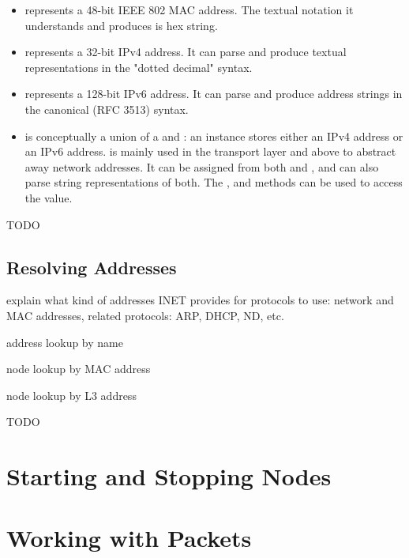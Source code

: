 \begin{itemize}
  \item {} represents a 48-bit IEEE 802 MAC address. The
    textual notation it understands and produces is hex string.

  \item {} represents a 32-bit IPv4 address. It can parse
    and produce textual representations in the "dotted decimal" syntax.

  \item {} represents a 128-bit IPv6 address. It can parse
    and produce address strings in the canonical (RFC 3513) syntax.

  \item {} is conceptually a union of a 
    and : an instance stores either an IPv4 address or an
    IPv6 address.  is mainly used in the transport layer and above
    to abstract away network addresses. It can be assigned from both 
    and , and can also parse string representations of both.
    The ,  and  methods can be used
    to access the value.
\end{itemize}

\ifdraft TODO
\subsection{Resolving Addresses}

explain what kind of addresses INET provides for protocols to use: network
and MAC addresses, related protocols: ARP, DHCP, ND, etc.

address lookup by name

node lookup by MAC address

node lookup by L3 address
\fi

\ifdraft TODO
\section{Starting and Stopping Nodes}


\fi

\section{Working with Packets}

